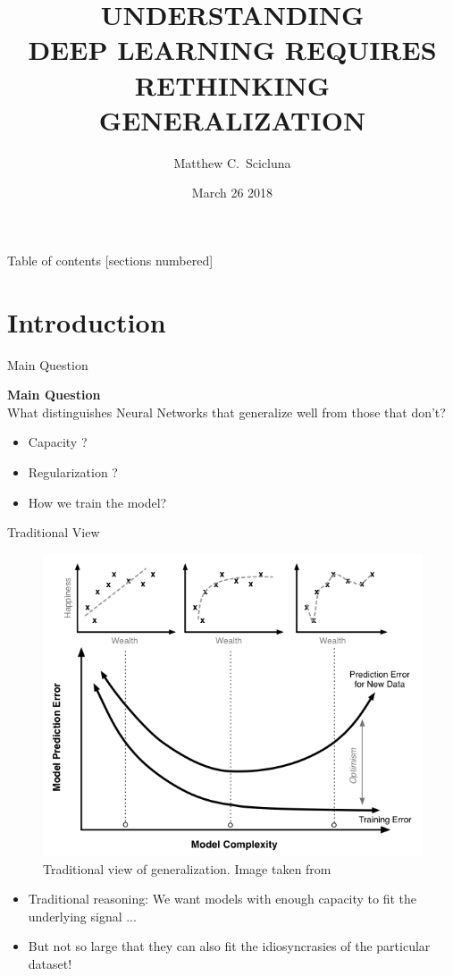 \documentclass[10pt]{beamer}
\title{UNDERSTANDING \\ DEEP LEARNING REQUIRES \\ RETHINKING GENERALIZATION}
\date{March 26 2018}
\author[shortname]{Matthew C.~Scicluna \inst{1}}
\institute[shortinst]{
\inst{1} Montr\'eal Institute of Learning Algorithms\\
Universit\'e de Montr\'eal}
\begin{document}
	
	\maketitle
	
	\begin{frame}{Table of contents}
		[sections numbered]
		\tableofcontents[hideallsubsections]
	\end{frame}
	
\section{Introduction}

\begin{frame}{Main Question}
	\begin{center}
		\textbf{Main Question}\\
		What distinguishes Neural Networks that generalize well from those that don't?
	\end{center}
	\begin{itemize}
		\item Capacity ?
		\item Regularization ?
		\item How we train the model?
	\end{itemize}
	
\end{frame}	

\begin{frame}{Traditional View}
	
	\begin{figure}
	\centering
		\includegraphics[width=0.5\linewidth]{complexity}
	\caption{Traditional view of generalization. Image taken from \cite{img1}}
	\label{fig:complexity}
	\end{figure}
	\begin{itemize}
		\item Traditional reasoning: We want models with enough capacity to fit the underlying signal ...
		\item But not so large that they can also fit the idiosyncrasies of the particular dataset!
	\end{itemize}

\end{frame}	
\end{document}
